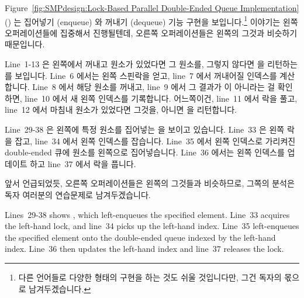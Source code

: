 Figure~\ref{fig:SMPdesign:Lock-Based Parallel Double-Ended Queue Implementation}
() 
는 집어넣기 (enqueue) 와 꺼내기 (dequeue) 기능 구현을 보입니다.\footnote{
	다른 언어들로 다양한 형태의 구현을 하는 것도 쉬울 것입니다만, 그건
	독자의 몫으로 남겨두겠습니다.}
이야기는 왼쪽 오퍼레이션들에 집중해서 진행될텐데, 오른쪽 오퍼레이션들은 왼쪽의
그것과 비슷하기 때문입니다.

Line~1-13 은 왼쪽에서 꺼내고 원소가 있었다면 그 원소를, 그렇지 않다면 
을 리턴하는  를 보입니다.
Line~6 에서는 왼쪽 스핀락을 얻고, line~7 에서 꺼내어질 인덱스를 계산합니다.
Line~8 에서 해당 원소를 꺼내고, line~9 에서 그 결과가  이 아니라는 걸
확인하면, line~10 에서 새 왼쪽 인덱스를 기록합니다.
어느쪽이건, line~11 에서 락을 풀고, line~12 에서 마침내 원소가 있었다면 그것을,
아니면  을 리턴합니다.

Line~29-38 은 왼쪽에 특정 원소를 집어넣는  을 보이고
있습니다.
Line~33 은 왼쪽 락을 잡고, line~34 에서 왼쪽 인덱스를 잡습니다.
Line~35 에서 왼쪽 인덱스로 가리켜진 double-ended 큐에 원소를 왼쪽으로
집어넣습니다.
Line~36 에서는 왼쪽 인덱스를 업데이트 하고 line~37 에서 락을 풉니다.

앞서 언급되었듯, 오른쪽 오퍼레이션들은 왼쪽의 그것들과 비슷하므로, 그쪽의
분석은 독자 여러분의 연습문제로 남겨두겠습니다.
\iffalse

Lines~29-38 shows , which left-enqueues the specified
element.
Line~33 acquires the left-hand lock, and line~34 picks up the left-hand
index.
Line~35 left-enqueues the specified element onto the double-ended queue
indexed by the left-hand index.
Line~36 then updates the left-hand index and line~37 releases the lock.

